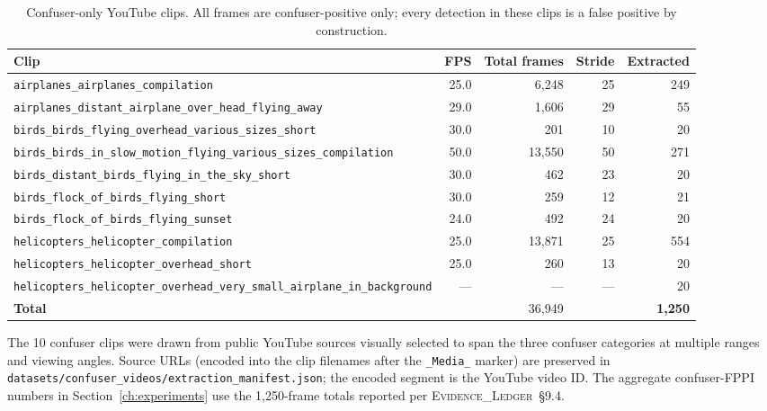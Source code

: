 \begin{table}[htbp]
    \centering
    \caption{Confuser-only YouTube clips. All frames are confuser-positive only; every detection in these clips is a false positive by construction.}
    \label{tab:youtube_confuser_clips}
    \begin{tabular}{lrrrr}
        \toprule
        Clip & FPS & Total frames & Stride & Extracted \\
        \midrule
        \texttt{airplanes\_airplanes\_compilation}             & 25.0 & 6{,}248 & 25 & 249 \\
        \texttt{airplanes\_distant\_airplane\_over\_head\_flying\_away} & 29.0 & 1{,}606 & 29 & 55 \\
        \texttt{birds\_birds\_flying\_overhead\_various\_sizes\_short} & 30.0 & 201 & 10 & 20 \\
        \texttt{birds\_birds\_in\_slow\_motion\_flying\_various\_sizes\_compilation} & 50.0 & 13{,}550 & 50 & 271 \\
        \texttt{birds\_distant\_birds\_flying\_in\_the\_sky\_short} & 30.0 & 462 & 23 & 20 \\
        \texttt{birds\_flock\_of\_birds\_flying\_short}        & 30.0 & 259 & 12 & 21 \\
        \texttt{birds\_flock\_of\_birds\_flying\_sunset}      & 24.0 & 492 & 24 & 20 \\
        \texttt{helicopters\_helicopter\_compilation}          & 25.0 & 13{,}871 & 25 & 554 \\
        \texttt{helicopters\_helicopter\_overhead\_short}      & 25.0 & 260 & 13 & 20 \\
        \texttt{helicopters\_helicopter\_overhead\_very\_small\_airplane\_in\_background} & --- & --- & --- & 20 \\
        \midrule
        \textbf{Total} & & 36{,}949 & & \textbf{1{,}250} \\
        \bottomrule
    \end{tabular}
\end{table}

\noindent The 10 confuser clips were drawn from public YouTube sources visually selected to span the three confuser categories at multiple ranges and viewing angles. Source URLs (encoded into the clip filenames after the \texttt{\_Media\_} marker) are preserved in \texttt{datasets/confuser\_videos/extraction\_manifest.json}; the encoded segment is the YouTube video ID. The aggregate confuser-FPPI numbers in Section~\ref{ch:experiments} use the 1{,}250-frame totals reported per \textsc{Evidence\_Ledger}~\S9.4.


